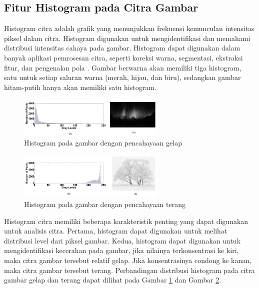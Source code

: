 \subsection{Fitur Histogram pada Citra Gambar}
Histogram citra adalah grafik yang menunjukkan frekuensi kemunculan intensitas piksel dalam citra. Histogram digunakan untuk mengidentifikasi dan memahami
distribusi intensitas cahaya pada gambar. Histogram dapat digunakan dalam banyak aplikasi pemrosesan citra, seperti koreksi warna, segmentasi, ekstraksi fitur,
dan pengenalan pola \cite{fiturhistogram}. Gambar berwarna akan memiliki tiga histogram, satu untuk setiap saluran warna (merah, hijau, dan biru), sedangkan
gambar hitam-putih hanya akan memiliki satu histogram.

\begin{figure}[!ht]
	\centering
	\includegraphics[width=7cm]{contents/chapter-2/2-histogramgelap.png}
	\caption[Histogram pada gambar dengan pencahayaan gelap]{Histogram pada gambar dengan pencahayaan gelap \cite{fiturhistogram}}
	\label{Fig: 2-histogramgelap}
\end{figure}

\begin{figure}[!ht]
	\centering
	\includegraphics[width=7cm]{contents/chapter-2/2-histogramterang.png}
	\caption[Histogram pada gambar dengan pencahayaan terang]{Histogram pada gambar dengan pencahayaan terang \cite{fiturhistogram}}
	\label{Fig: 2-histogramterang}
\end{figure}

Histogram citra memiliki beberapa karakteristik penting yang dapat digunakan untuk analisis citra. Pertama, histogram dapat digunakan untuk melihat distribusi
level dari piksel gambar. Kedua, histogram dapat digunakan untuk mengidentifikasi kecerahan pada gambar, jika nilainya terkonsentrasi ke kiri, maka citra
gambar tersebut relatif gelap. Jika konsentrasinya condong ke kanan, maka citra gambar tersebut terang. Perbandingan distribusi histogram pada citra gambar
gelap dan terang dapat dilihat pada Gambar \ref{Fig: 2-histogramgelap} dan Gambar \ref{Fig: 2-histogramterang}.

